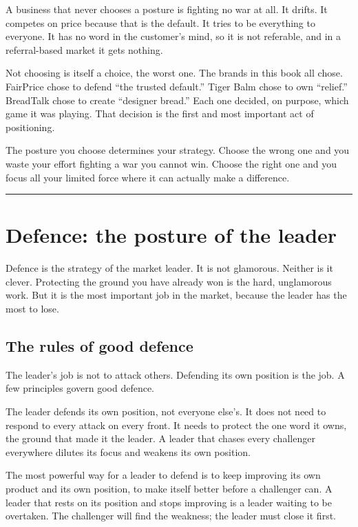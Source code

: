 \documentclass[10pt,twoside,openany]{memoir}
\newcommand{\needspacehead}{\needspace{4\baselineskip}}
\let\oldsection\section
\renewcommand{\section}{\needspacehead\oldsection}
\begin{document}
{A business that never chooses a posture is fighting no war at all. It
drifts. It competes on price because that is the default. It tries to be
everything to everyone. It has no word in the customer's mind, so it is
not referable, and in a referral-based market it gets nothing.

Not choosing is itself a choice, the worst one. The brands in this book
all chose. FairPrice chose to defend ``the trusted default.'' Tiger Balm
chose to own ``relief.'' BreadTalk chose to create ``designer bread.''
Each one decided, on purpose, which game it was playing. That decision
is the first and most important act of positioning.

The posture you choose determines your strategy. Choose the wrong one
and you waste your effort fighting a war you cannot win. Choose the
right one and you focus all your limited force where it can actually
make a difference.

\begin{center}\rule{0.5\linewidth}{0.5pt}\end{center}

\FloatBarrier
\chapter{Defence: the posture of the
leader}\label{defence-the-posture-of-the-leader}

Defence is the strategy of the market leader. It is not glamorous.
Neither is it clever. Protecting the ground you have already won is the
hard, unglamorous work. But it is the most important job in the market,
because the leader has the most to lose.

\section{The rules of good defence}\label{the-rules-of-good-defence}

The leader's job is not to attack others. Defending its own position is
the job. A few principles govern good defence.

The leader defends its own position, not everyone else's. It does not
need to respond to every attack on every front. It needs to protect the
one word it owns, the ground that made it the leader. A leader that
chases every challenger everywhere dilutes its focus and weakens its own
position.

The most powerful way for a leader to defend is to keep improving its
own product and its own position, to make itself better before a
challenger can. A leader that rests on its position and stops improving
is a leader waiting to be overtaken. The challenger will find the
weakness; the leader must close it first.

}
\end{document}
